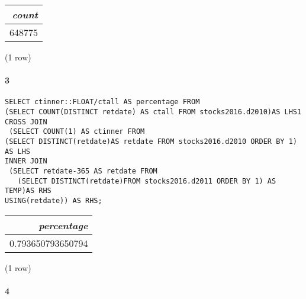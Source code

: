 \documentclass[]{article}
\let\oldparagraph\paragraph
\renewcommand{\paragraph}[1]{\oldparagraph{#1}\mbox{}}
\begin{document}
\begin{center}
\begin{tabular}{r}
\textit{count} \\
\hline
648775 \\
\end{tabular}

\noindent (1 row) \\
\end{center}

\paragraph{3}

\color{blue}
\begin{verbatim}
SELECT ctinner::FLOAT/ctall AS percentage FROM
(SELECT COUNT(DISTINCT retdate) AS ctall FROM stocks2016.d2010)AS LHS1
CROSS JOIN
 (SELECT COUNT(1) AS ctinner FROM
(SELECT DISTINCT(retdate)AS retdate FROM stocks2016.d2010 ORDER BY 1) AS LHS
INNER JOIN
 (SELECT retdate-365 AS retdate FROM
   (SELECT DISTINCT(retdate)FROM stocks2016.d2011 ORDER BY 1) AS TEMP)AS RHS
USING(retdate)) AS RHS;
\end{verbatim}
\color{black}

\begin{center}
\begin{tabular}{r}
\textit{percentage} \\
\hline
0.793650793650794 \\
\end{tabular}

\noindent (1 row) \\
\end{center}

\paragraph{4}
\end{document}
